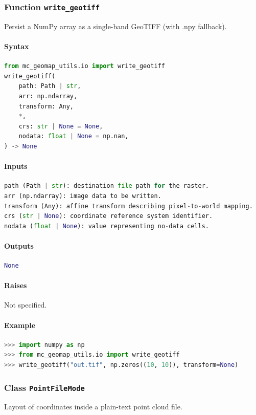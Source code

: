 \documentclass[11pt]{article}
\begin{document}
\subsubsection{Function \texttt{write\_geotiff}}
Persist a NumPy array as a single-band GeoTIFF (with .npy fallback).

\paragraph{Syntax}
\begin{lstlisting}[language=Python]
from mc_geomap_utils.io import write_geotiff
write_geotiff(
    path: Path | str,
    arr: np.ndarray,
    transform: Any,
    *,
    crs: str | None = None,
    nodata: float | None = np.nan,
) -> None
\end{lstlisting}
\paragraph{Inputs}
\begin{lstlisting}[language=Python]
path (Path | str): destination file path for the raster.
arr (np.ndarray): image data to be written.
transform (Any): affine transform describing pixel-to-world mapping.
crs (str | None): coordinate reference system identifier.
nodata (float | None): value representing no-data cells.
\end{lstlisting}
\paragraph{Outputs}
\begin{lstlisting}[language=Python]
None
\end{lstlisting}
\paragraph{Raises}
Not specified.
\paragraph{Example}
\begin{lstlisting}[language=Python]
>>> import numpy as np
>>> from mc_geomap_utils.io import write_geotiff
>>> write_geotiff("out.tif", np.zeros((10, 10)), transform=None)
\end{lstlisting}

\subsubsection{Class \texttt{PointFileMode}}
Layout of coordinates inside a plain-text point cloud file.
\end{document}
